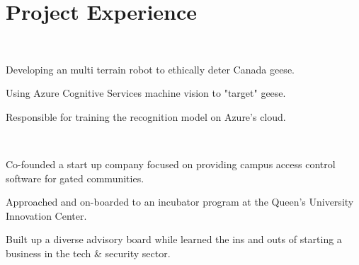 \documentclass[]{hieudo-build}
\begin{document}
\hfill
\begin{minipage}[t]{0.69\textwidth} 

\section{Project Experience}

\\
\vspace{\topsep} %
\begin{tightemize}
\item Developing an multi terrain robot to ethically deter Canada geese.
\item Using Azure Cognitive Services machine vision to "target" geese.
\item Responsible for training the recognition model on Azure's cloud.
\end{tightemize}
\sectionsep

 \\
\begin{tightemize}
\item Co-founded a start up company focused on providing campus access control software for gated communities.
\item Approached and on-boarded to an incubator program at the Queen's University Innovation Center.
\item Built up a diverse advisory board while learned the ins and outs of starting a business in the tech \& security sector.
\end{tightemize}
\sectionsep



\end{minipage}
\end{document}
